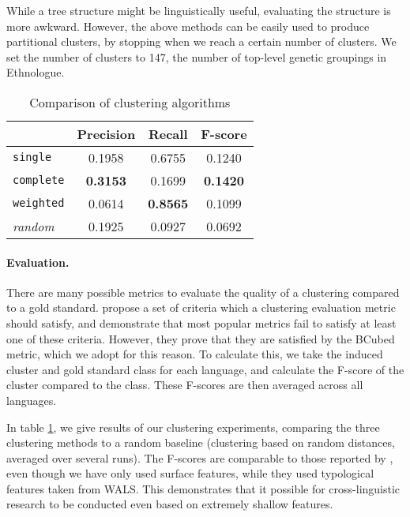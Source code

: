 While a tree structure might be linguistically useful, evaluating the structure is more awkward. However, the above methods can be easily used to produce partitional clusters, by stopping when we reach a certain number of clusters. We set the number of clusters to 147, the number of top-level genetic groupings in Ethnologue.

\begin{table}[t]
\begin{centering}

    \begin{tabular}{l|ccc}
    ~        & Precision & Recall       & F-score    \\ \hline
    \texttt{single} & 0.1958	& 0.6755	 & 0.1240  \\
	\texttt{complete} & \textbf{0.3153}	& 0.1699	 & \textbf{0.1420} \\
	\texttt{weighted} & 0.0614	& \textbf{0.8565}	 & 0.1099 \\ \hline
	\emph{random} & 0.1925 &	0.0927 & 	0.0692 \\
    \end{tabular}
\caption{Comparison of clustering algorithms}
\label{table:cluster}
\end{centering}
\end{table}

\paragraph{Evaluation.}
There are many possible metrics to evaluate the quality of a clustering compared to a gold standard. 
 propose a set of criteria which a clustering evaluation metric should satisfy, and demonstrate that most popular metrics fail to satisfy at least one of these criteria.  However, they prove that they are satisfied by the BCubed metric, which we adopt for this reason.  To calculate this, we take the induced cluster and gold standard class for each language, and calculate the F-score of the cluster compared to the class.  These F-scores are then averaged across all languages.

In table \ref{table:cluster}, we give results of our clustering experiments, comparing the three clustering methods to a random baseline (clustering based on random distances, averaged over several runs).  The F-scores are comparable to those reported by , even though we have only used surface features, while they used typological features taken from WALS.  This demonstrates that it possible for cross-linguistic research to be conducted even based on extremely shallow features.


